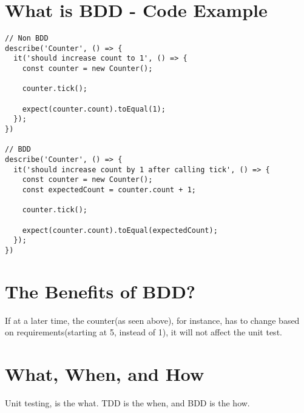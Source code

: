 \section{What is BDD - Code Example}
\begin{lstlisting}
// Non BDD
describe('Counter', () => {
  it('should increase count to 1', () => {
    const counter = new Counter();

    counter.tick();

    expect(counter.count).toEqual(1);
  });
})

// BDD
describe('Counter', () => {
  it('should increase count by 1 after calling tick', () => {
    const counter = new Counter();
    const expectedCount = counter.count + 1;

    counter.tick();

    expect(counter.count).toEqual(expectedCount);
  });
})
\end{lstlisting}

\section{ The Benefits of BDD? }
If at a later time, the counter(as seen above), for instance, has to change
based on requirements(starting at 5, instead of 1), it will not affect the unit
test.

\section{What, When, and How}
Unit testing, is the what. TDD is the when, and BDD is the how.

